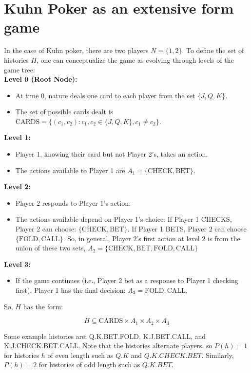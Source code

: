 \documentclass{article}
\begin{document}
\section{Kuhn Poker as an extensive form game}
In the case of Kuhn poker, there are two players $N = \{1,2 \}$. To define the set of histories $H$, one can conceptualize the game as evolving through levels of the game tree: \\



\textbf{Level 0 (Root Node):}
\begin{itemize}
\item At time 0, nature deals one card to each player from the set $\{J, Q, K \}$.
\item The set of possible cards dealt is $\text{CARDS}  = \{ (c_1, c_2) : c_1, c_2 \in \{J, Q, K \}, c_1 \neq c_2 \}$.
\end{itemize}

\textbf{Level 1:}
\begin{itemize}
\item Player 1, knowing their card but not Player 2's, takes an action.
\item The actions available to Player 1 are $A_1 = \{\text{CHECK}, \text{BET}\}$.
\end{itemize}
\textbf{Level 2:}
\begin{itemize}
\item Player 2 responds to Player 1's action. 
\item The actions available depend on Player 1's choice:
If Player 1 CHECKS, Player 2 can choose: $\{ \text{CHECK}, \text{BET} \}$. If Player 1 BETS, Player 2 can choose $\{ \text{FOLD}, \text{CALL} \}$. So, in general, Player 2's first action at level 2 is from the union of these two sets, $A_2 = \{\text{CHECK}, \text{BET}, \text{FOLD}, \text{CALL} \}$ 
\end{itemize}
\textbf{Level 3:} 
\begin{itemize}
\item If the game continues (i.e., Player 2 bet as a response to Player 1 checking first), Player 1 has the final decision: $A_3 = \text{FOLD}, \text{CALL}$.
\end{itemize}

So, $H$ has the form: 

\[ H \subseteq \text{CARDS} \times A_1 \times A_2 \times A_3 \]

Some example histories are: Q.K.BET.FOLD, K.J.BET.CALL, and K.J.CHECK.BET.CALL. Note that the histories alternate players, so $P(h)= 1$ for histories $h$ of even length such as $Q.K$ and $Q.K.CHECK.BET$. Similarly, $P(h) = 2$ for histories of odd length such as $Q.K.BET$.
\end{document}
